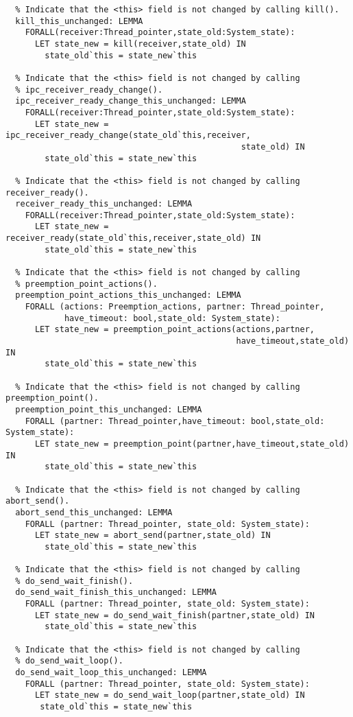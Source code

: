 \begin{lstlisting}
  % Indicate that the <this> field is not changed by calling kill().
  kill_this_unchanged: LEMMA
    FORALL(receiver:Thread_pointer,state_old:System_state):
      LET state_new = kill(receiver,state_old) IN
        state_old`this = state_new`this

  % Indicate that the <this> field is not changed by calling
  % ipc_receiver_ready_change().
  ipc_receiver_ready_change_this_unchanged: LEMMA
    FORALL(receiver:Thread_pointer,state_old:System_state):
      LET state_new = ipc_receiver_ready_change(state_old`this,receiver,
                                                state_old) IN
        state_old`this = state_new`this
  
  % Indicate that the <this> field is not changed by calling receiver_ready().
  receiver_ready_this_unchanged: LEMMA
    FORALL(receiver:Thread_pointer,state_old:System_state):
      LET state_new = receiver_ready(state_old`this,receiver,state_old) IN
        state_old`this = state_new`this

  % Indicate that the <this> field is not changed by calling
  % preemption_point_actions().
  preemption_point_actions_this_unchanged: LEMMA
    FORALL (actions: Preemption_actions, partner: Thread_pointer, 
            have_timeout: bool,state_old: System_state):
      LET state_new = preemption_point_actions(actions,partner,
                                               have_timeout,state_old) IN
        state_old`this = state_new`this

  % Indicate that the <this> field is not changed by calling preemption_point().
  preemption_point_this_unchanged: LEMMA
    FORALL (partner: Thread_pointer,have_timeout: bool,state_old: System_state):
      LET state_new = preemption_point(partner,have_timeout,state_old) IN
        state_old`this = state_new`this

  % Indicate that the <this> field is not changed by calling abort_send().
  abort_send_this_unchanged: LEMMA
    FORALL (partner: Thread_pointer, state_old: System_state):
      LET state_new = abort_send(partner,state_old) IN
        state_old`this = state_new`this
 
  % Indicate that the <this> field is not changed by calling
  % do_send_wait_finish().
  do_send_wait_finish_this_unchanged: LEMMA
    FORALL (partner: Thread_pointer, state_old: System_state):
      LET state_new = do_send_wait_finish(partner,state_old) IN
        state_old`this = state_new`this
       
  % Indicate that the <this> field is not changed by calling 
  % do_send_wait_loop().
  do_send_wait_loop_this_unchanged: LEMMA
    FORALL (partner: Thread_pointer, state_old: System_state):
      LET state_new = do_send_wait_loop(partner,state_old) IN
       state_old`this = state_new`this


\end{lstlisting}
